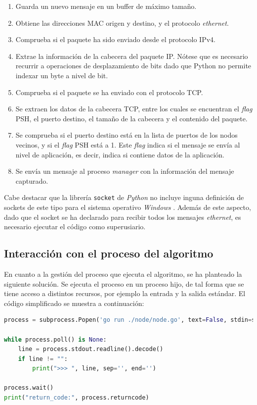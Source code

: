 \begin{enumerate}
\item Guarda un nuevo mensaje en un buffer de máximo tamaño.
\item Obtiene las direcciones MAC origen y destino, y el protocolo \textit{ethernet}.
\item Comprueba si el paquete ha sido enviado desde el protocolo IPv4.
\item Extrae la información de la cabecera del paquete IP. Nótese que es necesario recurrir a operaciones de desplazamiento de bits dado que Python no permite indexar un byte a nivel de bit.
\item Comprueba si el paquete se ha enviado con el protocolo TCP.
\item Se extraen los datos de la cabecera TCP, entre los cuales se encuentran el \textit{flag} PSH, el puerto destino, el tamaño de la cabecera y el contenido del paquete.
\item Se comprueba si el puerto destino está en la lista de puertos de los nodos vecinos, y si el \textit{flag} PSH está a 1. Este \textit{flag} indica si el mensaje se envía al nivel de aplicación, es decir, indica si contiene datos de la aplicación.
\item Se envía un mensaje al proceso \textit{manager} con la información del mensaje capturado.
\end{enumerate}

Cabe destacar que la librería \texttt{socket} de \textit{Python} no incluye inguna definición de sockets de este tipo para el sistema operativo \textit{Windows} \cite{pythonsocket}. Además de este aspecto, dado que el socket se ha declarado para recibir todos los mensajes \textit{ethernet}, es necesario ejecutar el código como superusiario.

\subsection{Interacción con el proceso del algoritmo}

En cuanto a la gestión del proceso que ejecuta el algoritmo, se ha planteado la siguiente solución. Se ejecuta el proceso en un proceso hijo, de tal forma que se tiene acceso a distintos recursos, por ejemplo la entrada y la salida estándar. El código simplificado se muestra a continuación:

\begin{lstlisting}[language=Python]
process = subprocess.Popen('go run ./node/node.go', text=False, stdin=subprocess.PIPE, stdout=subprocess.PIPE, stderr=subprocess.PIPE, universal_newlines=False, shell=True)

while process.poll() is None:
    line = process.stdout.readline().decode()
    if line != "":
        print(">>> ", line, sep='', end='')

process.wait()
print("return_code:", process.returncode)
\end{lstlisting}

